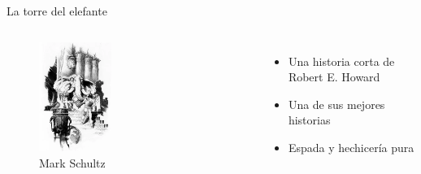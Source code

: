 \begin{frame}{}
	\maketitle
\end{frame}

\begin{frame}{La torre del elefante}
\begin{columns}
 \begin{figure}[htb]
  \centering
  \includegraphics[width=0.4\textwidth]{img/Intro}
  \caption{Mark Schultz}
\end{figure}
     \begin{itemize}
         \item Una historia corta de Robert E. Howard
         \item Una de sus mejores historias
         \item Espada y hechicería pura
     \end{itemize}
\end{columns}
\end{frame}


